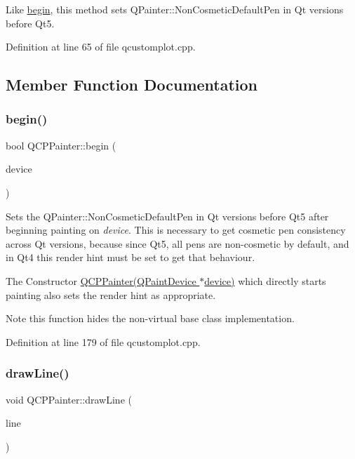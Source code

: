 Like \hyperlink{class_q_c_p_painter_a0a41146ccd619dceab6e25ec7b46b044}{begin}, this method sets Q\+Painter\+::\+Non\+Cosmetic\+Default\+Pen in Qt versions before Qt5. 

Definition at line 65 of file qcustomplot.\+cpp.



\subsection{Member Function Documentation}
\mbox{\label{class_q_c_p_painter_a0a41146ccd619dceab6e25ec7b46b044}} 
\subsubsection{\texorpdfstring{begin()}{begin()}}
{\footnotesize\ttfamily bool Q\+C\+P\+Painter\+::begin (\begin{DoxyParamCaption}\item[{Q\+Paint\+Device $\ast$}]{device }\end{DoxyParamCaption})}

Sets the Q\+Painter\+::\+Non\+Cosmetic\+Default\+Pen in Qt versions before Qt5 after beginning painting on {\itshape device}. This is necessary to get cosmetic pen consistency across Qt versions, because since Qt5, all pens are non-\/cosmetic by default, and in Qt4 this render hint must be set to get that behaviour.

The Constructor \hyperlink{class_q_c_p_painter_ae58dbb1795ddc4351ab324dc9898aa22}{Q\+C\+P\+Painter(\+Q\+Paint\+Device $\ast$device)} which directly starts painting also sets the render hint as appropriate.

\begin{DoxyNote}{Note}
this function hides the non-\/virtual base class implementation. 
\end{DoxyNote}


Definition at line 179 of file qcustomplot.\+cpp.

\mbox{\label{class_q_c_p_painter_a0b4b1b9bd495e182c731774dc800e6e0}} 
\subsubsection{\texorpdfstring{draw\+Line()}{drawLine()}}
{\footnotesize\ttfamily void Q\+C\+P\+Painter\+::draw\+Line (\begin{DoxyParamCaption}\item[{const Q\+LineF \&}]{line }\end{DoxyParamCaption})}

